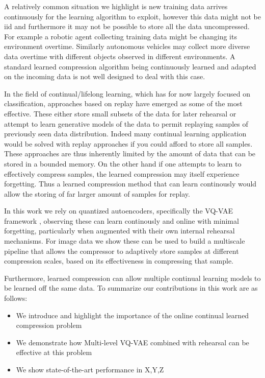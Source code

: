 \documentclass[colorinlistoftodos]{article} %
\begin{document}
A relatively common situation we highlight is new training data arrives continuously for the learning algorithm to exploit, however this data might not be iid and furthermore it may not be possible to store all the data uncompressed. For example a robotic agent collecting training data might be changing its environment overtime. Similarly autonomous vehicles may collect more diverse data overtime with different objects observed in different environments. A standard learned compression algorithm \cite{torfason2018towards} being continuously learned and adapted on the incoming data is not well designed to deal with this case.  

In the field of continual/lifelong learning, which has for now largely focused on classification, approaches based on replay have emerged as some of the most effective. These either store small subsets of the data for later rehearsal or attempt to learn generative models of the data to permit replaying samples of previously seen data distribution\cite{MIR,ER, GenReplay}. Indeed many continual learning application would be solved with replay approaches if you could afford to store all samples. These approaches are thus inherently limited by the amount of data that can be stored in a bounded memory. On the other hand if one attempts to learn to effectively compress samples, the learned compression may itself experience forgetting. Thus a learned compression method that can learn continously would allow the storing of far larger amount of samples for replay.

In this work we rely on quantized autoencoders, specifically the VQ-VAE framework \cite{VQVAE}, observing these can learn continously and online with minimal forgetting, particularly when augmented with their own internal rehearsal mechanisms. For image data we show these can be used to build a multiscale pipeline that allows the compressor to adaptively store samples at different compression scales, based on its effectiveness in compressing that sample.    

Furthermore, learned compression can allow multiple continual learning models to be learned off the same data. 
To summarize our contributions in this work are as follows:
\begin{itemize}
    \item We introduce and highlight the importance of the online continual learned compression problem
    \item We demonstrate how Multi-level VQ-VAE combined with rehearsal\cite{MIR,ER} can be effective at this problem
    \item We show state-of-the-art performance in X,Y,Z
\end{itemize}
\end{document}
